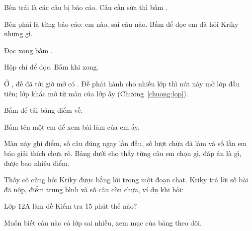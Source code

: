\begin{buoc}
  \item Bên trái là các câu bị báo cáo. Câu cần sửa thì bấm .
  \item Bên phải là từng báo cáo: em nào, sai câu nào. Bấm  để đọc em
        đã hỏi Kriky những gì.
  \item Đọc xong bấm .
\end{buoc}


Hộp  chỉ để đọc. Bấm  khi xong.



Ở , đề đã tới giờ mở có  . Đề phát hành cho nhiều lớp thì nút này
mở lớp đầu tiên; lớp khác mở từ màn của lớp ấy (Chương~\ref{chuong:lop}).


\begin{buoc}
  \item Bấm  để tải bảng điểm về.
  \item Bấm tên một em để xem bài làm của em ấy.
\end{buoc}



Màn này ghi điểm, số câu đúng ngay lần đầu, số lượt chữa đã làm và số lần em báo giải thích chưa rõ.
Bảng dưới cho thấy từng câu em chọn gì, đáp án là gì, được bao nhiêu điểm.


Thầy cô cũng hỏi Kriky được bằng lời trong một đoạn chat. Kriky trả lời số bài đã nộp, điểm trung
bình và số câu còn chữa, ví dụ khi hỏi:

\begin{loinhan}
Lớp 12A làm đề Kiểm tra 15 phút thế nào?
\end{loinhan}

Muốn biết câu nào cả lớp sai nhiều, xem mục  của bảng theo dõi.
